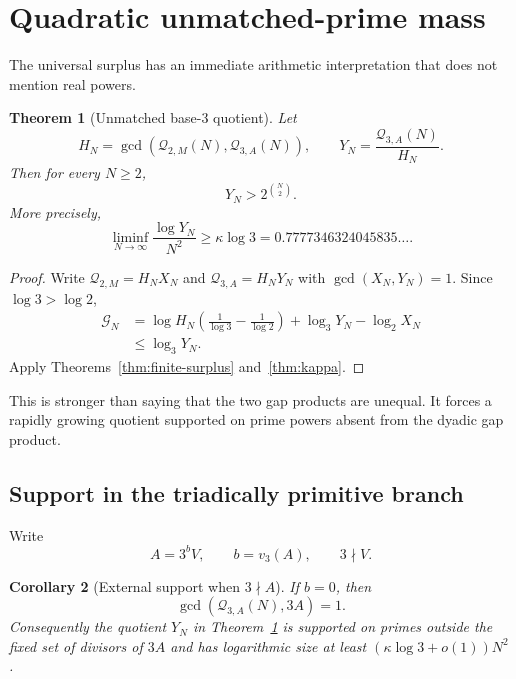 \documentclass[11pt,oneside]{article}
\newtheorem{theorem}{Theorem}[section]
\newtheorem{corollary}[theorem]{Corollary}
\theoremstyle{definition}
\theoremstyle{remark}
\newcommand{\vpp}[2]{v_{#1}\!\left(#2\right)}
\begin{document}
\section{Quadratic unmatched-prime mass}
\label{sec:unmatched}

The universal surplus has an immediate arithmetic interpretation that does not mention real
powers.

\begin{theorem}[Unmatched base-$3$ quotient]
\label{thm:unmatched}
Let
\begin{equation}
 H_N=\gcd(\mathcal Q_{2,M}(N),\mathcal Q_{3,A}(N)),
 \qquad
 Y_N=\frac{\mathcal Q_{3,A}(N)}{H_N}.
 \label{eq:HN-YN}
\end{equation}
Then for every $N\ge2$,
\begin{equation}
 Y_N>2^{\binom N2}.
 \label{eq:unmatched-finite}
\end{equation}
More precisely,
\begin{equation}
 \liminf_{N\to\infty}\frac{\log Y_N}{N^2}
 \ge\kappa\log3
 =0.7777346324045835\ldots.
 \label{eq:unmatched-asymp}
\end{equation}
\end{theorem}

\begin{proof}
Write $\mathcal Q_{2,M}=H_NX_N$ and $\mathcal Q_{3,A}=H_NY_N$ with
$\gcd(X_N,Y_N)=1$.  Since $\log3>\log2$,
\begin{align*}
 \mathcal G_N
 &=\log H_N\left(\frac1{\log3}-\frac1{\log2}\right)
 +\log_3 Y_N-\log_2 X_N\\
 &\le\log_3 Y_N.
\end{align*}
Apply Theorems~\ref{thm:finite-surplus} and~\ref{thm:kappa}.
\end{proof}

This is stronger than saying that the two gap products are unequal.  It forces a rapidly
growing quotient supported on prime powers absent from the dyadic gap product.

\subsection{Support in the triadically primitive branch}

Write
\begin{equation}
 A=3^bV,\qquad b=\vpp{3}{A},\qquad 3\nmid V.
 \label{eq:Adepth}
\end{equation}

\begin{corollary}[External support when $3\nmid A$]
\label{cor:external-support}
If $b=0$, then
\begin{equation}
 \gcd(\mathcal Q_{3,A}(N),3A)=1.
 \label{eq:Q3-coprime}
\end{equation}
Consequently the quotient $Y_N$ in Theorem~\ref{thm:unmatched} is supported on primes outside
the fixed set of divisors of $3A$ and has logarithmic size at least
$(\kappa\log3+o(1))N^2$.
\end{corollary}
\end{document}
